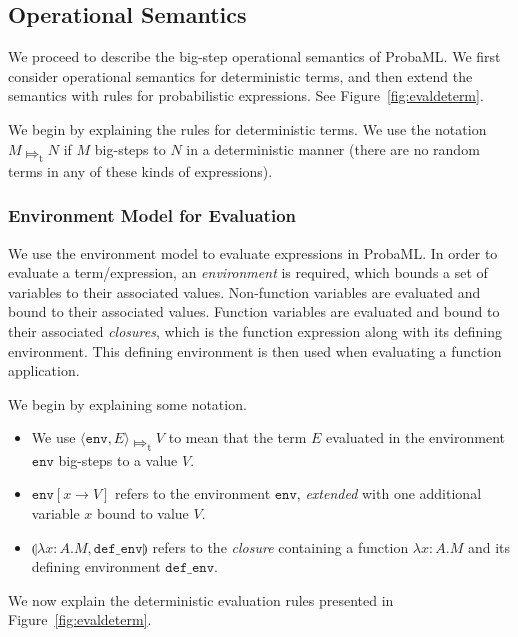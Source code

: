 \documentclass[pageno]{jpaper}
\newcommand{\tsteps}{\Mapsto_{\textrm{t}}}
\newcommand{\env}{\mathtt{env}}
\newcommand{\parens}[1]{\llparenthesis #1 \rrparenthesis}
\newcommand{\evalenv}[1]{\langle \env, #1 \rangle}
\newcommand{\mt}[1]{\mathtt{#1}}
\begin{document}
\subsection{Operational Semantics}
We proceed to describe the big-step operational semantics of ProbaML. We first consider operational semantics for deterministic terms, and then extend the semantics with rules for probabilistic expressions. See Figure~\ref{fig:evaldeterm}.

We begin by explaining the rules for deterministic terms. We use the notation $M \tsteps N$ if $M$ big-steps to $N$ in a deterministic manner (there are no random terms in any of these kinds of expressions).
\subsubsection{Environment Model for Evaluation}
We use the environment model to evaluate expressions in ProbaML. In order to evaluate a term/expression, an \emph{environment} is required, which bounds a set of variables to their associated values. Non-function variables are evaluated and bound to their associated values. Function variables are evaluated and bound to their associated \emph{closures}, which is the function expression along with its defining environment. This defining environment is then used when evaluating a function application.

We begin by explaining some notation.
\begin{itemize}
  \item We use $\evalenv{E} \tsteps V$ to mean that the term $E$ evaluated in the environment $\mt{env}$ big-steps to a value $V$.
  \item $\env[x \rightarrow V]$ refers to the environment $\env$, \emph{extended} with one additional variable $x$ bound to value $V$.
  \item $\parens{\lambda x:A.M, \mt{def\_env}}$ refers to the \emph{closure} containing a function $\lambda x:A.M$ and its defining environment $\mt{def\_env}$.
\end{itemize}

We now explain the deterministic evaluation rules presented in Figure~\ref{fig:evaldeterm}.
\end{document}
